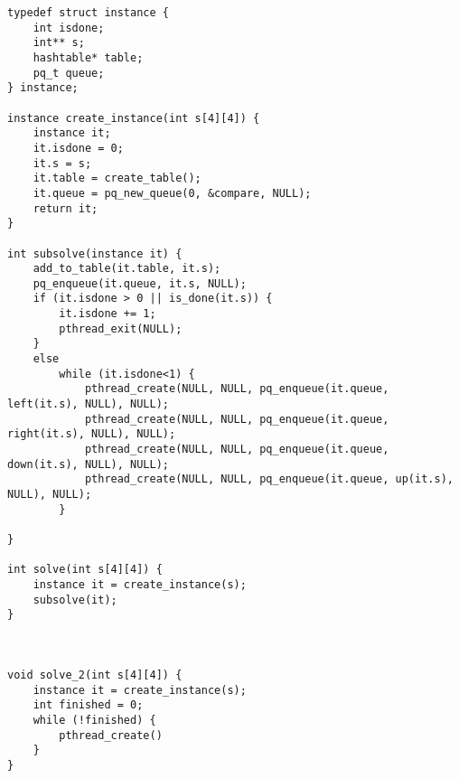 \documentclass[11pt]{article}
\begin{document}
\begin{verbatim}
typedef struct instance {
    int isdone;
    int** s;
    hashtable* table;
    pq_t queue;
} instance;

instance create_instance(int s[4][4]) {
    instance it;
    it.isdone = 0;
    it.s = s;
    it.table = create_table();
    it.queue = pq_new_queue(0, &compare, NULL);
    return it;
}

int subsolve(instance it) {
    add_to_table(it.table, it.s);
    pq_enqueue(it.queue, it.s, NULL);
    if (it.isdone > 0 || is_done(it.s)) {
        it.isdone += 1;
        pthread_exit(NULL);
    }
    else
        while (it.isdone<1) {
            pthread_create(NULL, NULL, pq_enqueue(it.queue, left(it.s), NULL), NULL);
            pthread_create(NULL, NULL, pq_enqueue(it.queue, right(it.s), NULL), NULL);
            pthread_create(NULL, NULL, pq_enqueue(it.queue, down(it.s), NULL), NULL);
            pthread_create(NULL, NULL, pq_enqueue(it.queue, up(it.s), NULL), NULL);
        }

}

int solve(int s[4][4]) {
    instance it = create_instance(s);
    subsolve(it);
}



void solve_2(int s[4][4]) {
    instance it = create_instance(s);
    int finished = 0;
    while (!finished) {
        pthread_create()
    }
}
\end{verbatim}
\end{document}
